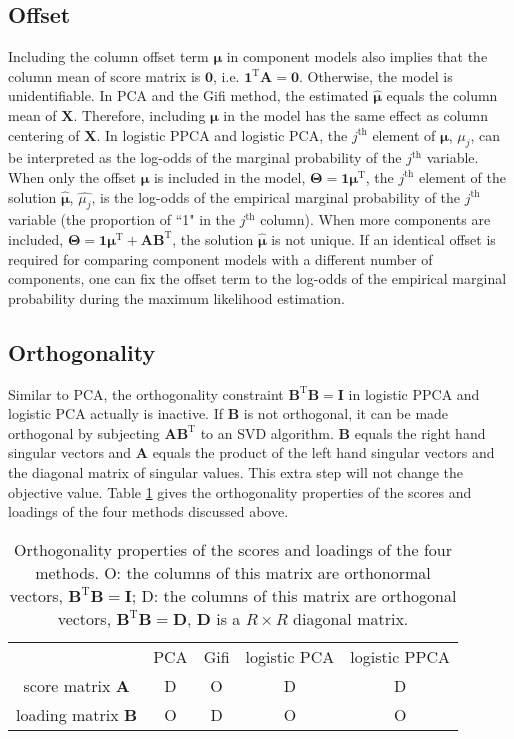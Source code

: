\subsection{Offset}
Including the column offset term $\bm{\mu}$ in component models also implies that the column mean of score matrix is $\mathbf{0}$, i.e. $\mathbf{1}^{\text{T}}\mathbf{A}=\mathbf{0}$. Otherwise, the model is unidentifiable. In PCA and the Gifi method, the estimated $\hat{\bm{\mu}}$ equals the column mean of $\mathbf{X}$. Therefore, including $\bm{\mu}$ in the model has the same effect as column centering of $\mathbf{X}$. In logistic PPCA and logistic PCA, the $j^{\text{th}}$ element of $\bm{\mu}$, $\mu_{j}$, can be interpreted as the log-odds of the marginal probability of the $j^{\text{th}}$ variable. When only the offset $\bm{\mu}$ is included in the model, $\mathbf{\Theta} = \mathbf{1}\bm{\mu}^{\text{T}}$, the $j^{\text{th}}$ element of the solution $\hat{\bm{\mu}}$, $\hat{\mu_{j}}$, is the log-odds of the empirical marginal probability of the $j^{\text{th}}$ variable (the proportion of ``1" in the $j^{\text{th}}$ column). When more components are included, $\mathbf{\Theta} = \mathbf{1}\bm{\mu}^{\text{T}} + \mathbf{A}\mathbf{B}^{\text{T}}$, the solution $\hat{\bm{\mu}}$ is not unique. If an identical offset is required for comparing component models with a different number of components, one can fix the offset term to the log-odds of the empirical marginal probability during the maximum likelihood estimation.

\subsection{Orthogonality}
Similar to PCA, the orthogonality constraint $\mathbf{B}^{\text{T}}\mathbf{B} = \mathbf{I}$ in logistic PPCA and logistic PCA actually is inactive. If $\mathbf{B}$ is not orthogonal, it can be made orthogonal by subjecting $\mathbf{A}\mathbf{B}^{\text{T}}$ to an SVD algorithm. $\mathbf{B}$ equals the right hand singular vectors and $\mathbf{A}$ equals the product of the left hand singular vectors and the diagonal matrix of singular values. This extra step will not change the objective value. Table \ref{chapter2_table:01} gives the orthogonality properties of the scores and loadings of the four methods discussed above.
\begin{table}[htbp]
\centering
\caption{Orthogonality properties of the scores and loadings of the four methods. O: the columns of this matrix are orthonormal vectors, $\mathbf{B}^{\text{T}}\mathbf{B} = \mathbf{I}$; D: the columns of this matrix are orthogonal vectors, $\mathbf{B}^{\text{T}}\mathbf{B} = \mathbf{D}$, $\mathbf{D}$ is a $R \times R$ diagonal matrix.}
\label{chapter2_table:01}
\begin{tabular}{|c|c|c|c|c|}
  \hline
                                & PCA & Gifi & logistic PCA & logistic PPCA \\
    score matrix $\mathbf{A}$   & D & O & D & D \\
    loading matrix $\mathbf{B}$ & O & D & O & O \\
    \hline
\end{tabular}
\end{table}

